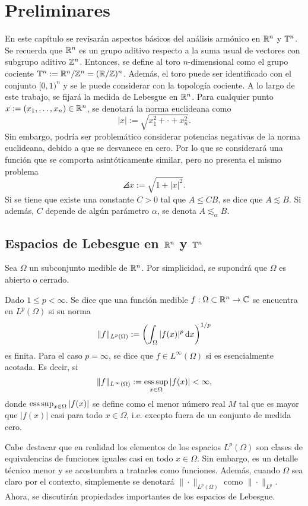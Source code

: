\chapter{Preliminares}

En este capítulo se revisarán aspectos básicos del análisis armónico en 
$\mathbb{R}^n$ y $\mathbb{T}^n$. 
Se recuerda que $\mathbb{R}^n$ es un grupo aditivo respecto a la suma usual de vectores
con subgrupo aditivo $\mathbb{Z}^n$. Entonces, se define al toro $n$-dimensional
como el grupo cociente $\mathbb{T}^n := \mathbb{R}^n/\mathbb{Z}^n = (\mathbb{R}/\mathbb{Z})^n$. Además, 
el toro puede ser identificado con el conjunto $[0, 1)^n$ y se le puede considerar
con la topología cociente. A lo largo de este trabajo, se fijará la
medida de Lebesgue en $\mathbb{R}^n$. Para cualquier punto 
$x := (x_1, \ldots, x_n) \in \mathbb{R}^n$, se denotará la norma
euclideana como 
\begin{equation*}
    |x| := \sqrt{x_1^2 + \cdot + x_n^2}.
\end{equation*}
Sin embargo, podría ser problemático considerar potencias negativas
de la norma euclideana, debido a que se desvanece en cero. Por lo que
se considerará una función que se comporta asintóticamente similar, 
pero no presenta el mismo problema
\begin{equation*}
    \angles{x} := \sqrt{1 + |x|^2}.
\end{equation*}
Si se tiene que existe una constante $C>0$ tal que $A\leq CB$, se dice que $A\lesssim B$. Si además, $C$ depende de algún parámetro $\alpha$, se denota $A\lesssim_\alpha B$.
\section{Espacios de Lebesgue en $\mathbb{R}^n$ y $\mathbb{T}^n$ }

Sea $\Omega$ un subconjunto medible de $\mathbb{R}^n$. Por simplicidad, se supondrá
que $\Omega$ es abierto o cerrado.

\begin{definition}
    Dado $1\leq p < \infty$. Se dice que una función medible $f:\Omega\subset\mathbb{R}^n\rightarrow\mathbb{C}$ se encuentra en $L^p(\Omega)$ si su norma 
    \begin{equation*}
        \|f\|_{L^p(\Omega)} := \left( \int_\Omega |f(x)|^p \mathop{}\!\mathrm{d} x
        \right)^{1/p}
    \end{equation*}
    es finita. Para el caso $p=\infty$, se dice que $f\in L^\infty(\Omega)$
    si es esencialmente acotada. Es decir, si
    \begin{equation*}
        \|f\|_{L^\infty(\Omega)} := \operatorname*{ess\,sup}_{x\in\Omega}|f(x)| < \infty,
    \end{equation*}
    donde $\operatorname*{ess\,sup}_{x\in\Omega}|f(x)|$ se define como el menor número real $M$
    tal que es mayor que $|f(x)|$ casi para todo $x\in\Omega$, i.e. excepto fuera de
    un conjunto de medida cero.
\end{definition}
Cabe destacar que en realidad los elementos de los espacios $L^p(\Omega)$
son clases de equivalencias de funciones iguales casi en todo $x\in\Omega$.
Sin embargo, es un detalle técnico menor y se acostumbra a tratarles como funciones.
Además, cuando $\Omega$ sea claro por el contexto, simplemente se denotará
$\|\cdot\|_{L^p(\Omega)}$ como $\|\cdot\|_{L^p}$. Ahora, se discutirán propiedades 
importantes de los espacios de Lebesgue.

